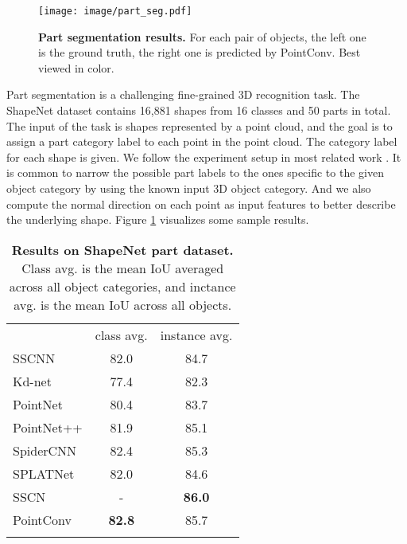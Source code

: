 \documentclass[10pt,twocolumn,letterpaper]{article}
\begin{document}
\begin{figure}
	\centering
	\texttt{[image: image/part\_seg.pdf]}
	\caption{\textbf{Part segmentation results.} For each pair of objects, the left one is the ground truth, the right one is predicted by PointConv. Best viewed in color.}
	\label{fig6}
\vspace{-0.3in}
\end{figure}

Part segmentation is a challenging fine-grained 3D recognition task. The ShapeNet dataset contains 16,881 shapes from 16 classes and 50 parts in total. The input of the task is shapes represented by a point cloud, and the goal is to assign a part category label to each point in the point cloud. The category label for each shape is given. We follow the experiment setup in most related work \cite{qi2017pointnet++, su2018splatnet, xu2018spidercnn, klokov2017escape}. It is common to narrow the possible part labels to the ones specific to the given object category by using the known input 3D object category. And we also compute the normal direction on each point as input features to better describe the underlying shape. Figure \ref{fig6} visualizes some sample results.


\setlength{\tabcolsep}{4pt}
\begin{table}
\vspace{0.2in}
	\begin{center}
		\caption{\textbf{Results on ShapeNet part dataset.} Class avg. is the mean IoU averaged across all object categories, and inctance avg. is the mean IoU across all objects.}
		\label{table1}
		\begin{tabular}{l|cc}
			\hline\noalign{\smallskip}
			      &class avg. & instance avg.\\
			\noalign{\smallskip}
			\hline
			\noalign{\smallskip}
			SSCNN \cite{yi2017syncspeccnn} & 82.0 & 84.7\\
			Kd-net \cite{klokov2017escape} & 77.4 & 82.3\\
			PointNet \cite{qi2017pointnet}       & 80.4 & 83.7\\
			PointNet++\cite{qi2017pointnet++}  & 81.9 & 85.1\\
			SpiderCNN \cite{xu2018spidercnn}& 82.4 & 85.3\\
			SPLATNet \cite{su2018splatnet}& 82.0 & 84.6\\
			SSCN \cite{graham2017submanifold}& - & \textbf{86.0}\\
			\noalign{\smallskip}
			\hline
			\noalign{\smallskip}
			PointConv & \textbf{82.8} & 85.7\\
			\noalign{\smallskip}
			\hline
		\end{tabular}
	\end{center}
\vspace{-0.4in}
\end{table}
\setlength{\tabcolsep}{1.4pt}
\end{document}
